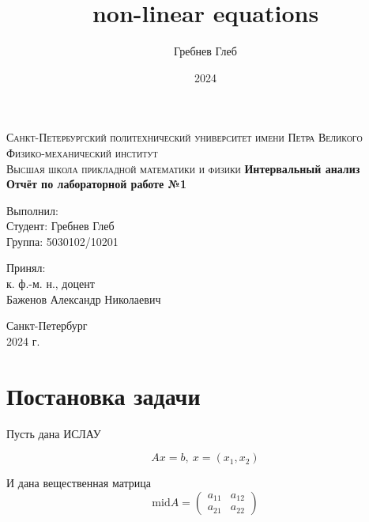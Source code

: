 \documentclass[a4paper,14pt]{article}
\title{non-linear equations}
\author{Гребнев Глеб}
\date{2024}
\begin{document}
	
	\begin{titlepage}
		\begin{center}
			\textsc{
				Санкт-Петербургский политехнический университет имени Петра Великого \\[5mm]
				Физико-механический институт\\[2mm]
				Высшая школа прикладной математики и физики            
			}   
			\vfill
			\textbf{\large
				Интервальный анализ\\
				Отчёт по лабораторной работе №1 \\[3mm]
			}                
		\end{center}
		
		\vfill
		\hfill
		\begin{minipage}{0.5\textwidth}
			Выполнил: \\[2mm]   
			Студент: Гребнев Глеб \\
			Группа: 5030102/10201\\
		\end{minipage}
		
		\hfill
		\begin{minipage}{0.5\textwidth}
			Принял: \\[2mm]
			к. ф.-м. н., доцент \\   
			Баженов Александр Николаевич
		\end{minipage}
		
		\vfill
		\begin{center}
			Санкт-Петербург \\2024 г.
		\end{center}
	\end{titlepage}
	
	\tableofcontents
	\newpage
	
	\section{Постановка задачи}
	Пусть дана ИСЛАУ

	\[
		Ax = b, \ x = (x_1, x_2)
	\]

	И дана вещественная матрица
	\begin{equation}\text{mid} A = 
		\begin{pmatrix}
			a_{11} & a_{12}\\ 
			a_{21} & a_{22}
		\end{pmatrix}
	\end{equation}
\end{document}
